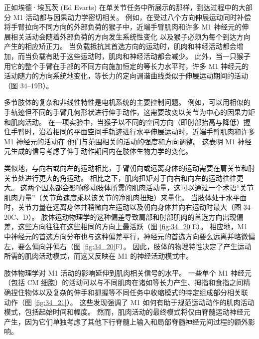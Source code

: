 正如埃德·埃瓦茨 (Ed Evarts) 在单关节任务中所展示的那样，到达过程中的大部分 M1 活动都与因果动力学密切相关。 例如，在受过八个方向伸展运动同时补偿将手臂拉向不同方向的外部负荷的猴子中，近端手臂肌肉和许多 M1 神经元的伸展相关活动会随着外部负荷的方向发生系统性变化 以及猴子必须为每个到达方向产生的相应矫正力。 当负载抵抗其首选方向的运动时，肌肉和神经活动都会增加，而当负载有助于这些运动时，肌肉和神经活动都会减少。 此外，当一只猴子用它的整个手臂在手部的不同方向施加恒定的等长力水平时，许多 M1 神经元的活动随力的方向系统地变化，等长力的定向调谐曲线类似于伸展运动期间的活动 （图 34–19B）。

多节肢体的复杂和非线性特性是电机系统的主要控制问题。 例如，可以用相似的手轨迹但不同的手臂几何形状进行伸手动作，这需要改变以关节为中心的因果力矩和肌肉活动。 在一项实验中，当猴子以不同的空间方向（即肘部抬高与降低）握住手臂时，沿着相同的平面空间手轨迹进行水平伸展运动时，近端手臂肌肉和许多 M1 神经元的活动在 他们与范围相关的活动的强度和方向调整。 这表明 M1 神经元生成的信号考虑了伸手动作期间内在肢体生物力学的变化。

类似地，与向右或向左的运动相比，手臂朝向或远离身体的运动需要在肩关节和肘关节处进行更大的角运动。 相比之下，肌肉扭矩对于向右和向左的运动往往更大。 这两个因素都会影响移动肢体所需的肌肉活动量，这可以通过一个术语“关节肌肉力量”（关节角速度乘以该关节的净肌肉扭矩）来量化。 当肢体处于水平面时，关节力量在远离身体并稍微向左运动以及朝向身体并向右运动时最大（图 34–20C、D）。 肢体运动物理学的这种偏差导致肩部和肘部肌肉的首选方向出现偏差，这些方向往往在这些相同的方向上最活跃（图 \ref{fig:34_20}E）。 相应地，M1 中神经元的首选方向分布也与这种偏差平行，神经元的首选方向要么远离并略微偏左，要么偏向并偏右（图 \ref{fig:34_20}F）。 因此，肢体的物理特性决定了产生运动所需的肌肉活动模式，而这又反映在 M1 的神经活动模式中。

肢体物理学对 M1 活动的影响延伸到肌肉相关信号的水平。 
一些单个 M1 神经元（包括 CM 细胞）的活动可以与不同肌肉在诸如等长力产生、拇指和食指之间精确捏住物体以及复杂的伸手和抓握等不同任务中收缩模式的特定组成部分相关联 动作（图 \ref{fig:34_21}）。
这些发现强调了 M1 如何有助于规范运动动作的肌肉活动模式，包括起始时间和幅度。 然而，肌肉活动的最终模式将仅由脊髓运动神经元产生，因为它们单独考虑了其他下行脊髓上输入和局部脊髓神经元间过程的额外影响。

